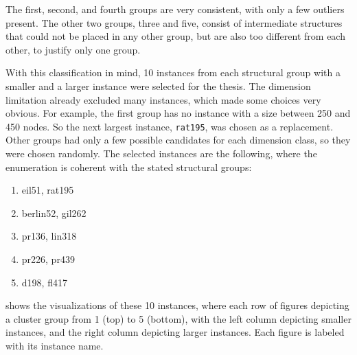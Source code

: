 The first, second, and fourth groups are very consistent, with only a few outliers present. The other two groups, three and five, consist of intermediate structures that could not be placed in any other group, but are also too different from each other, to justify only one group. 

With this classification in mind, 10 instances from each structural group with a smaller and a larger instance were selected for the thesis. The dimension limitation already excluded many instances, which made some choices very obvious. For example, the first group has no instance with a size between 250 and 450 nodes. So the next largest instance, \texttt{rat195}, was chosen as a replacement. Other groups had only a few possible candidates for each dimension class, so they were chosen randomly. The selected instances are the following, where the enumeration is coherent with the stated structural groups:
\begin{enumerate}
	\item eil51, rat195
	\item berlin52, gil262
	\item pr136, lin318
	\item pr226, pr439
	\item d198, fl417
\end{enumerate}
 shows the visualizations of these 10 instances, where each row of figures depicting a cluster group from 1 (top) to 5 (bottom), with the left column depicting smaller instances, and the right column depicting larger instances. Each figure is labeled with its instance name.

